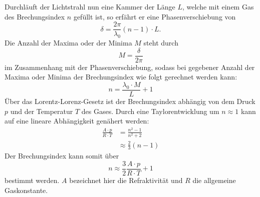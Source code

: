 \noindent Durchläuft der Lichtstrahl nun eine Kammer der Länge $L$, welche mit einem Gas des Brechungsindex $n$ gefüllt ist, so erfährt er eine 
Phasenverschiebung von 
\begin{equation*}
    \delta = \frac{2 \pi}{\lambda_0} \left(n-1\right) \cdot L.
\end{equation*}
Die Anzahl der Maxima oder der Minima $M$ steht durch 
\begin{equation*}
    M = \frac{\delta}{2 \pi}
\end{equation*}
im Zusammenhang mit der Phasenverschiebung, sodass bei gegebener Anzahl der Maxima oder Minima der Brechungsindex wie folgt gerechnet werden kann:
\begin{equation}
    n = \frac{\lambda_0\cdot M}{L} + 1
    \label{eqn:n_Luft}
\end{equation}
\noindent Über das Lorentz-Lorenz-Gesetz ist der Brechungsindex abhängig von dem Druck $p$ und der Temperatur $T$ des Gases. Durch eine Taylorentwicklung um $n \approx 1$ kann auf eine 
lineare Abhängigkeit genähert werden:
\begin{align*}
    \frac{A \cdot p}{R \cdot T} &= \frac{n^2 - 1}{n^2 + 2} \\
    &\approx \frac{2}{3}\left( n - 1 \right) 
\end{align*}
Der Brechungsindex kann somit über 
\begin{equation}
    n \approx \frac{3}{2} \frac{A \cdot p}{R \cdot T} + 1
    \label{eqn:Lorentz_Lorenz}
\end{equation}
bestimmt werden. $A$ bezeichnet hier die Refraktivität und $R$ die allgemeine Gaskonstante.